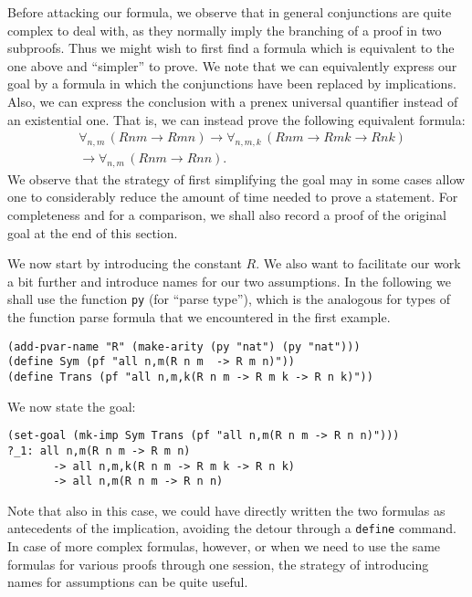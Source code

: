 \documentclass[12pt]{amsart}
\newcommand{\inquotes}[1]{``#1''}
\newcommand{\ob}{\to}
\begin{document}
Before attacking our formula, we observe that in general conjunctions
are quite complex to deal with, as they normally imply the branching
of a proof in two subproofs.  Thus we might wish to first find a
formula which is equivalent to the one above and \inquotes{simpler} to
prove.  We note that we can equivalently express our goal by a formula
in which the conjunctions have been replaced by implications. Also, we
can express the conclusion with a prenex universal quantifier instead
of an existential one.  That is, we can instead prove the following
equivalent formula:
\begin{align*}
        &       \forall_{n, m}\, (R n m \ob R m n)
                \ob \forall_{n, m, k}\,
                (R n m \ob R m k \ob R n k)\\
        &       \ob \forall_{n, m}\, (R n m \ob R n n).
\end{align*}
We observe that the strategy of first simplifying the goal may in some
cases allow one to considerably reduce the amount of time needed to
prove a statement.  For completeness and for a comparison, we shall
also record a proof of the original goal at the end of this section.

We now start by introducing the constant $R$. We also want to
facilitate our work a bit further and introduce names for our two
assumptions.  In the following we shall use the function \texttt{py}
(for \inquotes{parse type}), which is the analogous for types of the
function parse formula that we encountered in the first example.
\begin{verbatim}
(add-pvar-name "R" (make-arity (py "nat") (py "nat")))
(define Sym (pf "all n,m(R n m  -> R m n)"))
(define Trans (pf "all n,m,k(R n m -> R m k -> R n k)"))
\end{verbatim}

We now state the goal:
\begin{verbatim}
(set-goal (mk-imp Sym Trans (pf "all n,m(R n m -> R n n)")))
?_1: all n,m(R n m -> R m n)
       -> all n,m,k(R n m -> R m k -> R n k)
       -> all n,m(R n m -> R n n)
\end{verbatim}

Note that also in this case, we could have directly written the two
formulas as antecedents of the implication, avoiding the detour
through a \texttt{define} command.  In case of more complex formulas,
however, or when we need to use the same formulas for various proofs
through one session, the strategy of introducing names for assumptions
can be quite useful.
\end{document}
